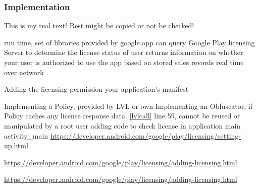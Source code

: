 \subsubsection{Implementation}\label{subsection:license-google-implementation}
This is my real text! Rest might be copied or not be checked!



%
run time, set of libraries provided by google
app can query Google Play licensing Server to determine the license status of user
returns information on whether your user is authorized to use the app based on stored sales revords
real time over network
\cite{developersLicensingBlog}
%

%
Adding the licensing permission your application's manifest

Implementing a Policy, provided by LVL or own
Implementing an Obfuscator, if Policy caches any license response data. \ref{lvlcall} line 59, cannot be reused or manipulated by a root user
adding code to check license in application main activity_main
\cite{developersLicensingAdding}
%
\url{https://developer.android.com/google/play/licensing/setting-up.html}

\url{https://developer.android.com/google/play/licensing/adding-licensing.html}





\cite{developersLicensingAdding}
\url{https://developer.android.com/google/play/licensing/adding-licensing.html}
